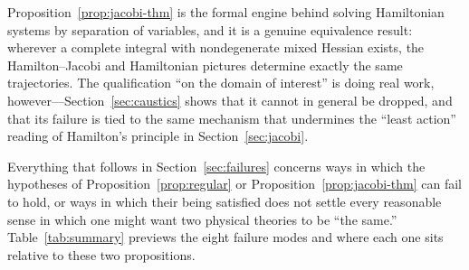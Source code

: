 \documentclass[11pt]{article}
\begin{document}
Proposition~\ref{prop:jacobi-thm} is the formal engine behind solving Hamiltonian systems by separation of variables, and it is a genuine equivalence result: wherever a complete integral with nondegenerate mixed Hessian exists, the Hamilton--Jacobi and Hamiltonian pictures determine exactly the same trajectories. The qualification ``on the domain of interest'' is doing real work, however---Section~\ref{sec:caustics} shows that it cannot in general be dropped, and that its failure is tied to the same mechanism that undermines the ``least action'' reading of Hamilton's principle in Section~\ref{sec:jacobi}.

Everything that follows in Section~\ref{sec:failures} concerns ways in which the hypotheses of Proposition~\ref{prop:regular} or Proposition~\ref{prop:jacobi-thm} can fail to hold, or ways in which their being satisfied does not settle every reasonable sense in which one might want two physical theories to be ``the same.'' Table~\ref{tab:summary} previews the eight failure modes and where each one sits relative to these two propositions.
\end{document}
